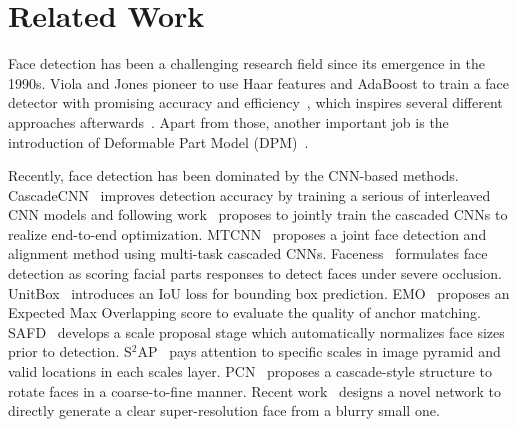 \documentclass[letterpaper]{article} \usepackage{aaai19m}  \usepackage{times}  \usepackage{helvet}  \usepackage{courier}  \usepackage{url}  \usepackage{graphicx}  \usepackage{subfigure}
\begin{document}
\section{Related Work}
Face detection has been a challenging research field since its emergence in the 1990s. Viola and Jones pioneer to use Haar features and AdaBoost to train a face detector with promising accuracy and efficiency~\cite{DBLP:journals/ijcv/ViolaJ04}, which inspires several different approaches afterwards~\cite{DBLP:journals/pami/LiaoJL16,DBLP:journals/ijcv/BrubakerWSMR08,DBLP:conf/iccv/PhamC07}. Apart from those, another important job is the introduction of Deformable Part Model (DPM)~\cite{DBLP:conf/eccv/MathiasBPG14,DBLP:conf/cvpr/YanLWL14,DBLP:conf/cvpr/ZhuR12}. 

Recently, face detection has been dominated by the CNN-based methods. 
CascadeCNN~\cite{DBLP:conf/cvpr/LiLSBH15} improves detection accuracy by training a serious of interleaved CNN models and following work~\cite{DBLP:conf/cvpr/QinYLH16} proposes to jointly train the cascaded CNNs to realize end-to-end optimization. MTCNN~\cite{DBLP:journals/spl/ZhangZLQ16} proposes a joint face detection and alignment method using multi-task cascaded CNNs. Faceness~\cite{DBLP:conf/iccv/YangLLT15} formulates face detection as scoring facial parts responses to detect faces under severe occlusion. UnitBox~\cite{DBLP:conf/mm/YuJWCH16} introduces an IoU loss for bounding box prediction. EMO~\cite{zhu2018seeing} proposes an Expected Max Overlapping score to evaluate the quality of anchor matching. SAFD~\cite{hao2017scale} develops a scale proposal stage which automatically normalizes face sizes prior to detection. S$^{2}$AP~\cite{song2018beyond} pays attention to specific scales in image pyramid and valid locations in each scales layer. PCN~\cite{shi2018real} proposes a cascade-style structure to rotate faces in a coarse-to-fine manner. Recent work~\cite{bai2018finding} designs a novel network to directly generate a clear super-resolution face from a blurry small one.
\end{document}
